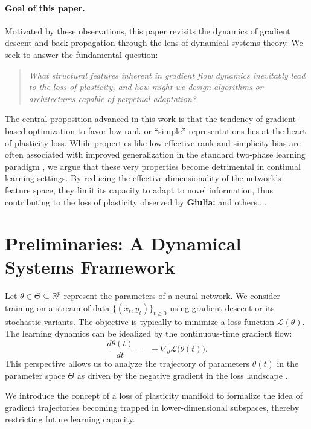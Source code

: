\documentclass{article}
\newcommand{\Loss}{\mathcal{L}}
\newcommand{\R}{\mathbb{R}}
\newcommand{\giulia}[1]{{\color{ForestGreen}\textbf{Giulia:} #1}}
\begin{document}
\paragraph{Goal of this paper.}
Motivated by these observations, this paper revisits the dynamics of gradient descent and back-propagation through the lens of dynamical systems theory. We seek to answer the fundamental question:
\begin{quote}
\emph{What structural features inherent in gradient flow dynamics inevitably lead to the loss of plasticity, and how might we design algorithms or architectures capable of perpetual adaptation?}
\end{quote}
The central proposition advanced in this work is that the tendency of gradient-based optimization to favor low-rank or ``simple'' representations lies at the heart of plasticity loss. While properties like low effective rank and simplicity bias are often associated with improved generalization in the standard two-phase learning paradigm \cite{huh2022lowrank, papyan2020prevalence, zhang2017understanding}, we argue that these very properties become detrimental in continual learning settings. By reducing the effective dimensionality of the network's feature space, they limit its capacity to adapt to novel information, thus contributing to the loss of plasticity observed by \cite{dohare2024loss} \giulia{and others...}.

\section{Preliminaries: A Dynamical Systems Framework}
\label{sec:framework}

Let $\theta\in\Theta\subseteq\R^p$ represent the parameters of a neural network. We consider training on a stream of data $\{(x_t,y_t)\}_{t\ge0}$ using gradient descent or its stochastic variants. The objective is typically to minimize a loss function $\Loss(\theta)$. The learning dynamics can be idealized by the continuous-time gradient flow:
\begin{equation}
    \frac{d\theta(t)}{dt} \;=\; -\nabla_\theta\Loss\bigl(\theta(t)\bigr).
    \label{eq:grad_flow}
\end{equation}
This perspective allows us to analyze the trajectory of parameters $\theta(t)$ in the parameter space $\Theta$ as driven by the negative gradient in the loss landscape \cite{saxe2014exact}.

We introduce the concept of a loss of plasticity manifold to formalize the idea of gradient trajectories becoming trapped in lower-dimensional subspaces, thereby restricting future learning capacity.
\end{document}
